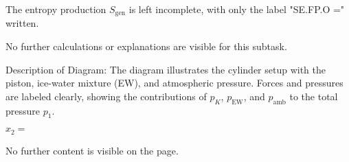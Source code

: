 The entropy production \( S_{\text{gen}} \) is left incomplete, with only the label "SE.FP.O =" written.  

No further calculations or explanations are visible for this subtask.  

Description of Diagram:  
The diagram illustrates the cylinder setup with the piston, ice-water mixture (EW), and atmospheric pressure. Forces and pressures are labeled clearly, showing the contributions of \( p_K \), \( p_{\text{EW}} \), and \( p_{\text{amb}} \) to the total pressure \( p_1 \).

\( x_2 = \)  

No further content is visible on the page.